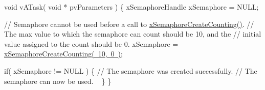 \begin{DoxyPre}void vATask( void * pvParameters )
\{
xSemaphoreHandle xSemaphore = NULL;\end{DoxyPre}



\begin{DoxyPre}   // Semaphore cannot be used before a call to \mbox{\hyperlink{semphr_8h_a7764616a918a46115403569a88148ad4}{xSemaphoreCreateCounting()}}.
   // The max value to which the semaphore can count should be 10, and the
   // initial value assigned to the count should be 0.
   xSemaphore = \mbox{\hyperlink{semphr_8h_a7764616a918a46115403569a88148ad4}{xSemaphoreCreateCounting( 10, 0 )}};\end{DoxyPre}



\begin{DoxyPre}   if( xSemaphore != NULL )
   \{
       // The semaphore was created successfully.
       // The semaphore can now be used.  
~\newline
   \}
\}
\end{DoxyPre}
 